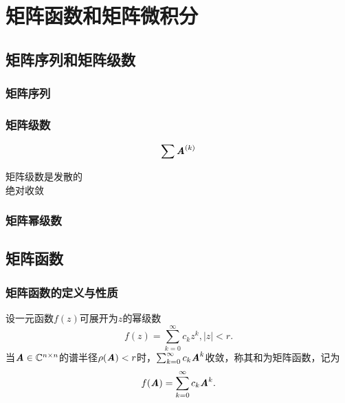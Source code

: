 \chapter{矩阵函数和矩阵微积分}
\label{cha:矩阵函数和矩阵微积分}

\section{矩阵序列和矩阵级数}
\label{sec:矩阵序列和矩阵级数}

\subsection{矩阵序列}
\label{sub:矩阵序列}

\subsection{矩阵级数}
\label{sub:矩阵级数}

\begin{definition}[矩阵级数]
    $$
    \sum \boldsymbol{\mathit{A}}^{(k)}
    $$
\end{definition}

\begin{definition}
    \begin{description}
        \item[矩阵级数是发散的]
        \item[绝对收敛]
    \end{description}
\end{definition}

\subsection{矩阵幂级数}
\label{sub:矩阵幂级数}

\section{矩阵函数}
\label{sec:矩阵函数}

\subsection{矩阵函数的定义与性质}
\label{sub:矩阵函数的定义与性质}

\begin{definition}
    设一元函数$f(z)$可展开为$z$的幂级数
    \[
        f(z) = \sum_{k=0}^{\infty} c_kz^k, |z| < r.
    \]
当$\boldsymbol{\mathit{A}} \in \mathbb{C}^{n \times n}$的谱半径$\rho(\boldsymbol{\mathit{A}}) < r$时，$\sum_{k=0}^{\infty} c_k\boldsymbol{\mathit{A}}^k$收敛，称其和为矩阵函数，记为
    \[
        f(\boldsymbol{\mathit{A}}) = \sum_{k=0}^{\infty} c_k\boldsymbol{\mathit{A}}^k.
    \]
\end{definition}

